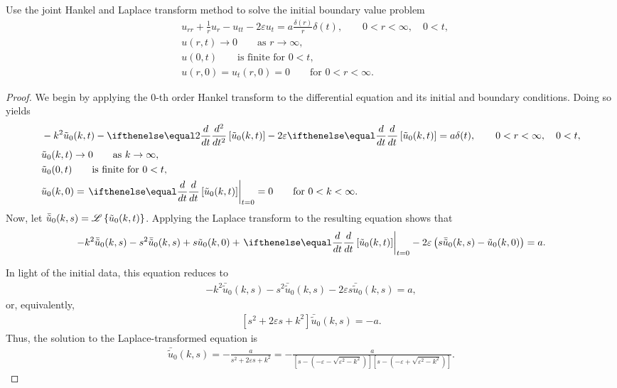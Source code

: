 \begin{problem}{7.19}
  Use the joint Hankel and Laplace transform method to solve the initial boundary value problem
  \begin{align*}
    &u_{rr} + \frac{1}{r}u_r - u_{tt} - 2 \varepsilon u_t = a \frac{\delta(r)}{r}\delta(t), \qquad 0 < r < \infty, \quad 0 < t, \\
    &u(r, t) \to 0 \qquad \text{as $r \to \infty$}, \\
    &u(0, t) \qquad \text{is finite for $0 < t$}, \\
    &u(r, 0) = u_t(r, 0) = 0 \qquad \text{for $0 < r < \infty$}.
  \end{align*}
\end{problem}

\begin{proof}
  We begin by applying the 0-th order Hankel transform to the differential equation and its initial and boundary conditions. Doing so yields
  \begin{align*}
    &-k^2\tilde{u}_0(k, t) - \der{t}{2}\left[\tilde{u}_0(k, t)\right] -2\varepsilon \der{t}{}\left[\tilde{u}_0(k, t)\right] = a\delta(t), \qquad 0 < r < \infty, \quad 0 < t,\\
    &\tilde{u}_0(k, t) \to 0 \qquad \text{as $k \to \infty$}, \\
    &\tilde{u}_0(0, t) \qquad \text{is finite for $0 < t$}, \\
    &\tilde{u}_0(k, 0) = \left.\der{t}{}\left[\tilde{u}_0(k, t)\right]\right\rvert_{t=0} = 0 \qquad \text{for $0 < k < \infty$}.
  \end{align*}
  Now, let $\bar{\tilde{u}}_0(k, s) = \mathscr{L}\left\{ {\tilde{u}_0(k, t)} \right\}$. Applying the Laplace transform to the resulting equation shows that
  \begin{align*}
    -k^2\bar{\tilde{u}}_0(k, s) - s^2\bar{\tilde{u}}_0(k, s) + s \tilde{u}_0(k, 0) +\left.\der{t}{}\left[\tilde{u}_0(k, t)\right]\right\rvert_{t=0} - 2\varepsilon\left(s\bar{\tilde{u}}_0(k, s) - \tilde{u}_0(k, 0)\right) = a.
  \end{align*}

  In light of the initial data, this equation reduces to
  \begin{align*}
    -k^2\bar{\tilde{u}}_0(k, s) - s^2\bar{\tilde{u}}_0(k, s) - 2\varepsilon s \bar{\tilde{u}}_0(k, s) = a,
  \end{align*}
  or, equivalently,
  \begin{align*}
    \left[s^2 + 2\varepsilon s +k^2\right]\bar{\tilde{u}}_0(k, s) = -a.
  \end{align*}
  Thus, the solution to the Laplace-transformed equation is
  \begin{align*}
    \bar{\tilde{u}}_0(k, s) = -\frac{a}{s^2 + 2\varepsilon s +k^2} = -\frac{a}{\left[s - \left(-\varepsilon -\sqrt{\varepsilon^2 - k^2}\right)\right]\left[s- \left(-\varepsilon +\sqrt{\varepsilon^2 - k^2}\right)\right]}.
  \end{align*}


\end{proof}
